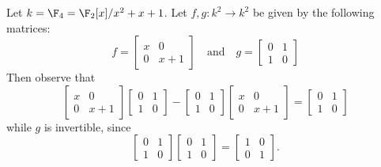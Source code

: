 Let $k=\F_4=\F_2[x]/x^2+x+1$. Let $f,g : k^2 \to k^2$ be given by the following matrices:
\[
f = \begin{bmatrix}x&0\\0&x+1\end{bmatrix}\quad \mathrm{ and } \quad g = \begin{bmatrix}0&1\\1&0\end{bmatrix}
\]
Then observe that
\[
\begin{bmatrix}x&0\\0&x+1\end{bmatrix}\begin{bmatrix}0&1\\1&0\end{bmatrix}-\begin{bmatrix}0&1\\1&0\end{bmatrix}\begin{bmatrix}x&0\\0&x+1\end{bmatrix}=\begin{bmatrix}0&1\\1&0\end{bmatrix}
\]
while $g$ is invertible, since 
\[
\begin{bmatrix}0&1\\1&0\end{bmatrix}\begin{bmatrix}0&1\\1&0\end{bmatrix}=\begin{bmatrix}1&0\\0&1\end{bmatrix}
.\]      